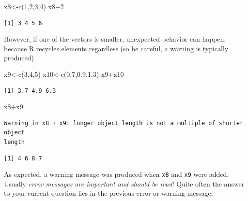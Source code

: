 \documentclass[
  letterpaper,
  DIV=11,
  numbers=noendperiod]{scrartcl}
\newenvironment{Shaded}{\begin{snugshade}}{\end{snugshade}}
\newcommand{\DecValTok}[1]{\textcolor[rgb]{0.68,0.00,0.00}{#1}}
\newcommand{\FloatTok}[1]{\textcolor[rgb]{0.68,0.00,0.00}{#1}}
\newcommand{\FunctionTok}[1]{\textcolor[rgb]{0.28,0.35,0.67}{#1}}
\newcommand{\NormalTok}[1]{\textcolor[rgb]{0.00,0.23,0.31}{#1}}
\newcommand{\OtherTok}[1]{\textcolor[rgb]{0.00,0.23,0.31}{#1}}
\newcommand{\SpecialCharTok}[1]{\textcolor[rgb]{0.37,0.37,0.37}{#1}}
\begin{document}
\begin{Shaded}
\begin{Highlighting}[]
\NormalTok{x8}\OtherTok{\textless{}{-}}\FunctionTok{c}\NormalTok{(}\DecValTok{1}\NormalTok{,}\DecValTok{2}\NormalTok{,}\DecValTok{3}\NormalTok{,}\DecValTok{4}\NormalTok{)}
\NormalTok{x8}\SpecialCharTok{+}\DecValTok{2}
\end{Highlighting}
\end{Shaded}

\begin{verbatim}
[1] 3 4 5 6
\end{verbatim}

However, if one of the vectors is smaller, unexpected behavior can
happen, because R recycles elements regardless (so be careful, a warning
is typically produced)

\begin{Shaded}
\begin{Highlighting}[]
\NormalTok{x9}\OtherTok{\textless{}{-}}\FunctionTok{c}\NormalTok{(}\DecValTok{3}\NormalTok{,}\DecValTok{4}\NormalTok{,}\DecValTok{5}\NormalTok{)}
\NormalTok{x10}\OtherTok{\textless{}{-}}\FunctionTok{c}\NormalTok{(}\FloatTok{0.7}\NormalTok{,}\FloatTok{0.9}\NormalTok{,}\FloatTok{1.3}\NormalTok{)}
\NormalTok{x9}\SpecialCharTok{+}\NormalTok{x10}
\end{Highlighting}
\end{Shaded}

\begin{verbatim}
[1] 3.7 4.9 6.3
\end{verbatim}

\begin{Shaded}
\begin{Highlighting}[]
\NormalTok{x8}\SpecialCharTok{+}\NormalTok{x9}
\end{Highlighting}
\end{Shaded}

\begin{verbatim}
Warning in x8 + x9: longer object length is not a multiple of shorter object
length
\end{verbatim}

\begin{verbatim}
[1] 4 6 8 7
\end{verbatim}

As expected, a warning message was produced when \texttt{x8} and
\texttt{x9} were added. Usually \emph{error messages are important and
should be read}! Quite often the answer to your current question lies in
the previous error or warning message.
\end{document}
